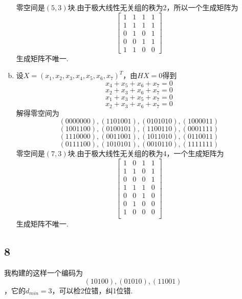\documentclass[twocolumn]{article}
\newenvironment{SChinese}{
	\CJKfamily{gbsn}
	\CJKtilde
	\CJKnospace}{}
\begin{document}
\begin{CJK}{UTF8}{}
\begin{SChinese}
\begin{enumerate}[(a)]
\begin{displaymath}
					\end{displaymath}
					零空间是$(5,3)$块.由于极大线性无关组的秩为2，所以一个生成矩阵为\begin{displaymath}
						\left [\begin{matrix}
						1 & 1 & 1 & 1\\
						1 & 1 & 1 & 1\\
						0 & 1 & 0 & 1\\
						0 & 0 & 1 & 1\\
						1 & 1 & 0 & 0
						\end{matrix}\right]
					\end{displaymath}
					生成矩阵不唯一.\\
					\item 设$X=(x_1,x_2,x_3,x_4,x_5,x_6,x_7)^T$，由$HX=0$得到
					\[x_4+x_5+x_6+x_7=0\]
					\[x_2+x_3+x_6+x_7=0\]
					\[x_1+x_3+x_5+x_7=0\]
					\[x_2+x_3+x_6+x_7=0\]
					解得零空间为\[(0000000),(1101001),(0101010),(1000011)\]
					\[(1001100),(0100101),(1100110),(0001111)\]
					\[(1110000),(0011001),(1011010),(0110011)\]
					\[(0111100),(1010101),(0010110),(1111111)\]
					零空间是$(7,3)$块.由于极大线性无关组的秩为4，一个生成矩阵为\begin{displaymath}
					\left [\begin{matrix}
					1 & 0 & 1 & 1\\
					1 & 1 & 0 & 1\\
					0 & 0 & 0 & 1\\
					1 & 1 & 1 & 0\\
					0 & 0 & 1 & 0\\
					0 & 1 & 0 & 0\\
					1 & 0 & 0 & 0\\ 
					\end{matrix}\right]
					\end{displaymath}
					生成矩阵不唯一.
				\end{enumerate}
			\subsection*{8}
				我构建的这样一个编码为\[(10100),(01010),(11001)\]，它的$d_{min}=3$，可以检2位错，纠1位错.

\end{SChinese}
\end{CJK}
\end{document}
